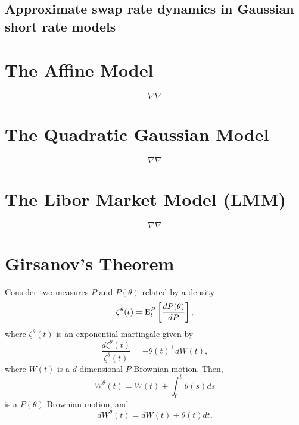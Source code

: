\documentclass[12pt]{article}
\begin{document}
  \subsection{Approximate swap rate dynamics in Gaussian short rate models}



\section{The Affine Model}

  $$\nabla\nabla$$

\section{The Quadratic Gaussian Model}

  $$\nabla\nabla$$

\section{The Libor Market Model (LMM)}

  $$\nabla\nabla$$

\appendix

  \section{Girsanov's Theorem}

  Consider two measures $P$ and $P(\theta)$ related by a density
  \begin{equation}
    \zeta^{\theta}(t) = {\rm E}_t^P\left[\frac{dP(\theta)}{dP}\right],
  \end{equation}
  where $\zeta^{\theta}(t)$ is an exponential martingale given by
  \begin{equation}
    \frac{d\zeta^{\theta}(t)}{\zeta^{\theta}(t)}=-\theta(t)^{\top}dW(t),
  \end{equation}
  where $W(t)$ is a $d$-dimensional $P$-Brownian motion. Then,
  \begin{equation}
    W^{\theta}(t) = W(t)+\int_0^t\theta(s)ds
  \end{equation}
  is a $P(\theta)$-Brownian motion, and
  \begin{equation}
    dW^{\theta}(t) = dW(t)+ \theta(t)dt.
  \end{equation}






\end{document}
